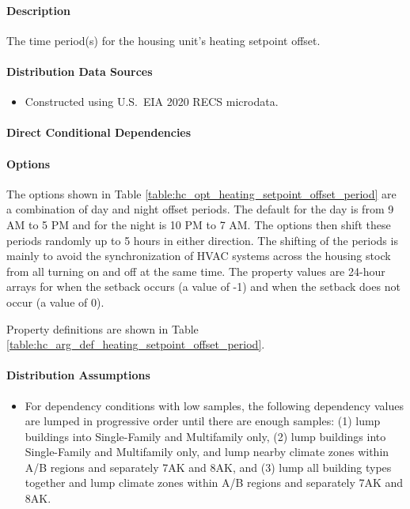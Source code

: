 \paragraph{Description}
% 
The time period(s) for the housing unit's heating setpoint offset. 

\paragraph{Distribution Data Sources}
% 
\begin{itemize}
\item Constructed using U.S.~EIA 2020 RECS microdata.
\end{itemize}

\paragraph{Direct Conditional Dependencies}


\paragraph{Options}
The options shown in Table \ref{table:hc_opt_heating_setpoint_offset_period} are a combination of day and night offset periods. The default for the day is from 9 AM to 5 PM and for the night is 10 PM to 7 AM. The options then shift these periods randomly up to 5 hours in either direction. The shifting of the periods is mainly to avoid the synchronization of HVAC systems across the housing stock from all turning on and off at the same time. The property values are 24-hour arrays for when the setback occurs (a value of -1) and when the setback does not occur (a value of 0).



Property definitions are shown in Table \ref{table:hc_arg_def_heating_setpoint_offset_period}.



\paragraph{Distribution Assumptions}
% 
\begin{itemize}
    \item For dependency conditions with low samples, the following dependency values are lumped in progressive order until there are enough samples: (1) lump buildings into Single-Family and Multifamily only, (2) lump buildings into Single-Family and Multifamily only, and lump nearby climate zones within A/B regions and separately 7AK and 8AK, and (3) lump all building types together and lump climate zones within A/B regions and separately 7AK and 8AK.
\end{itemize}

